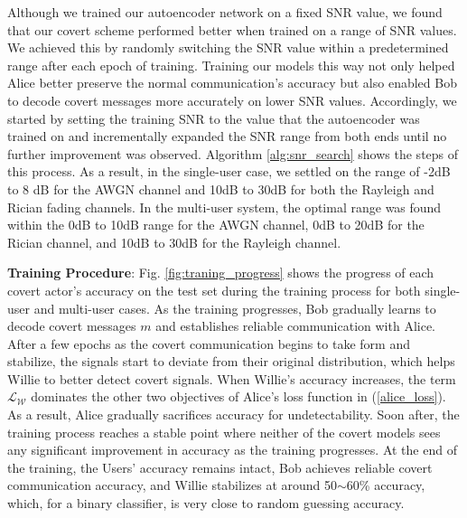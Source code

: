 Although we trained our autoencoder network on a fixed SNR value, we found that our covert scheme performed better when trained on a range of SNR values. We achieved this by randomly switching the SNR value within a predetermined range after each epoch of training. Training our models this way not only helped Alice better preserve the normal communication's accuracy but also enabled Bob to decode covert messages more accurately on lower SNR values. Accordingly, we started by setting the training SNR to the value that the autoencoder was trained on and incrementally expanded the SNR range from both ends until no further improvement was observed. Algorithm \ref{alg:snr_search} shows the steps of this process. As a result, in the single-user case, we settled on the range of -2dB to 8 dB for the AWGN channel and 10dB to 30dB for both the Rayleigh and Rician fading channels. In the multi-user system, the optimal range was found within the 0dB to 10dB range for the AWGN channel, 0dB to 20dB for the Rician channel, and 10dB to 30dB for the Rayleigh channel.

\textbf{Training Procedure}: Fig. \ref{fig:traning_progress} shows the progress of each covert actor's accuracy on the test set during the training process for both single-user and multi-user cases. As the training progresses, Bob gradually learns to decode covert messages \(m\) and establishes reliable communication with Alice. After a few epochs as the covert communication begins to take form and stabilize, the signals start to deviate from their original distribution, which helps Willie to better detect covert signals. When Willie's accuracy increases, the term \(\mathcal{L}_{\mathcal{W}}\) dominates the other two objectives of Alice's loss function in (\ref{alice_loss}). As a result, Alice gradually sacrifices accuracy for undetectability. Soon after, the training process reaches a stable point where neither of the covert models sees any significant improvement in accuracy as the training progresses. At the end of the training, the Users' accuracy remains intact, Bob achieves reliable covert communication accuracy, and Willie stabilizes at around 50$\sim$60\% accuracy, which, for a binary classifier, is very close to random guessing accuracy.

